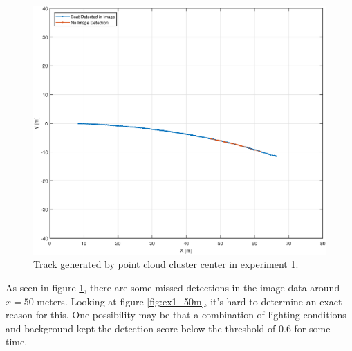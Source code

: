 \begin{figure}[H]
	\centering
	\includegraphics[width=.8\linewidth]{fig/exp_1_track.eps}
	\caption{Track generated by point cloud cluster center in experiment 1.}
	\label{fig:ex1_track}
\end{figure}
As seen in figure \ref{fig:ex1_track}, there are some missed detections in the image data around $x=50$ meters.
Looking at figure \ref{fig:ex1_50m}, it's hard to determine an exact reason for this. One possibility may be that a combination of lighting conditions and background kept the detection score below the threshold of 0.6 for some time.
